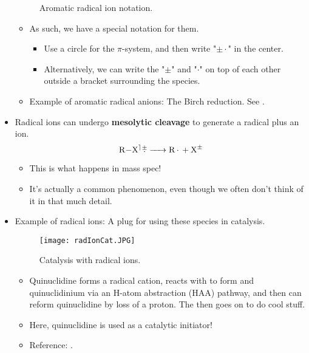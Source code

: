 \documentclass[../notes.tex]{subfiles}
\begin{document}
\begin{itemize}
\begin{figure}[h!]
        \caption{Aromatic radical ion notation.}
        \label{fig:radIonArNot}
    \end{figure}
    \pagebreak
    \begin{itemize}
        \item As such, we have a special notation for them.
        \begin{itemize}
            \item Use a circle for the $\pi$-system, and then write "$\pm\cdot$" in the center.
            \item Alternatively, we can write the "$\pm$" and "$\cdot$" on top of each other outside a bracket surrounding the species.
        \end{itemize}
        \item Example of aromatic radical anions: The Birch reduction. See \textcite{bib:CHEM22100Notes}.
    \end{itemize}
    \item Radical ions can undergo \textbf{mesolytic cleavage} to generate a radical plus an ion.
    \begin{equation*}
        \ce{R-X${}^\rceil\rca$ -> R* + X^{$\pm$}}
    \end{equation*}
    \begin{itemize}
        \item This is what happens in mass spec!
        \item It's actually a common phenomenon, even though we often don't think of it in that much detail.
    \end{itemize}
    \item Example of radical ions: A plug for using these species in catalysis.
    \begin{figure}[h!]
        \centering
        \texttt{[image: radIonCat.JPG]}
        \caption{Catalysis with radical ions.}
        \label{fig:radIonCat}
    \end{figure}
    \begin{itemize}
        \item Quinuclidine forms a radical cation, reacts with  to form  and quinuclidinium via an H-atom abstraction (HAA) pathway, and then can reform quinuclidine by loss of a proton. The  then goes on to do cool stuff.
        \item Here, quinuclidine is used as a catalytic initiator!
        \item Reference: \textcite{bib:radIonCat}.
    \end{itemize}
\end{itemize}
\end{document}
